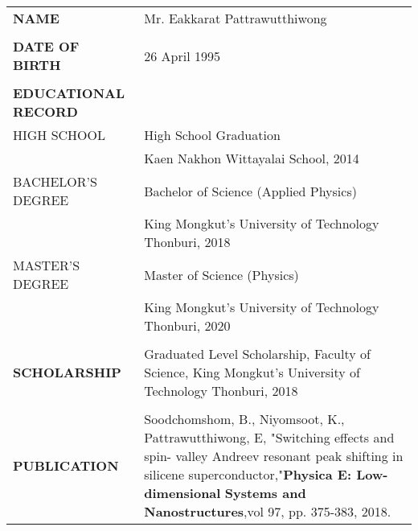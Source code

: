 \begin{tabular}{p{}p{}}
\textbf{NAME} & Mr. Eakkarat Pattrawutthiwong\\
\\

\textbf{DATE OF BIRTH} & 26 April  1995\\
\\

\textbf{EDUCATIONAL RECORD} & \\

HIGH SCHOOL & High School Graduation\\
            & Kaen Nakhon Wittayalai School, 2014 \\

BACHELOR'S DEGREE   & Bachelor of Science (Applied Physics) \\
                    & King Mongkut's University of Technology Thonburi, 2018 \\

MASTER'S DEGREE & Master of Science (Physics) \\
                & King Mongkut's University of Technology Thonburi, 2020 \\
\\

\textbf{SCHOLARSHIP}    & Graduated Level Scholarship, Faculty of Science, 
                        King Mongkut's University of Technology Thonburi, 2018\\
\\

\textbf{PUBLICATION}   & Soodchomshom, B., Niyomsoot, K.,
                        Pattrawutthiwong, E, "Switching effects and spin- 
                        valley Andreev resonant peak shifting in silicene
                        superconductor,"\textbf{Physica E: Low-dimensional}
                        \textbf{Systems and Nanostructures},vol 97, pp. 375-383,
                        2018.\\

\end{tabular}
